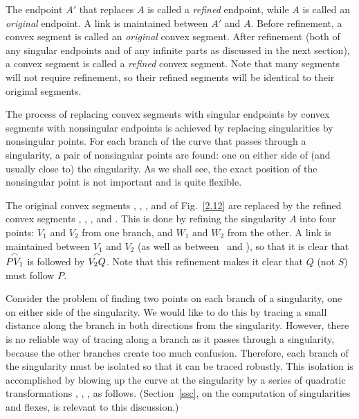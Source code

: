 The endpoint $A'$ that replaces $A$ is called a {\em refined} endpoint,
while $A$ is called an {\em original} endpoint.
A link is maintained between $A'$ and $A$.
Before refinement, a convex segment is called an {\em original} convex 
segment.
After refinement (both of any singular endpoints and of any infinite parts 
as discussed in 
the next section), a convex segment is called a {\em refined} convex 
segment.
Note that many segments will not require refinement, so their refined 
segments
will be identical to their original segments.

The process of replacing convex segments with singular endpoints
by convex segments with nonsingular endpoints 
is achieved by replacing singularities by nonsingular points.
For each branch of the curve that passes through a singularity, 
a pair of nonsingular points are found: one on either side of (and usually 
close to) 
the singularity.
As we shall see, the exact position of the nonsingular point is not 
important and is quite flexible.


\begin{example}
\label{eg-pseudo}
\rm{
The original convex segments , , , and 
of Fig.~\ref{2.12} are replaced by the refined convex segments
, , , and .
This is done by refining the singularity $A$ into four points:
$V_{1}$ and $V_{2}$ from one branch, and $W_{1}$ and $W_{2}$ from the other.
A link is maintained between $V_{1}$ and $V_{2}$ (as well as between \wo\ 
and \wt),
so that it is clear that $\mbox{$\stackrel{\frown}{PV_{1}}$}$ is followed by $\mbox{$\stackrel{\frown}{V_{2}Q}$}$.
Note that this refinement makes it clear that $Q$ (not $S$) must follow $P$.
}
\end{example}

Consider the problem of finding two points on each branch of a 
singularity, one on either 
side of the singularity.
We would like to do this by tracing \cite{bhhl} a small distance along 
the branch
in both directions from the singularity.
However, there is no reliable way of tracing along a branch as it passes
through a singularity, because the other branches create too much confusion.
Therefore, each branch of the singularity must be isolated so that it can 
be traced robustly.
This isolation is accomplished by blowing up the curve at the 
singularity by 
a series of quadratic transformations \cite{bhhl}, \cite{walker}, 
\cite{abhy}, as follows.
(Section~\ref{ssc}, on the computation
of singularities and flexes, is relevant to this discussion.)

